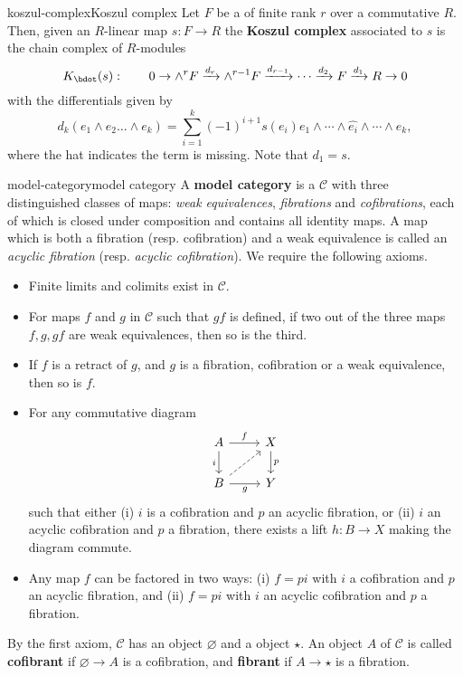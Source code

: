 \begin{topic}{koszul-complex}{Koszul complex}
    Let $F$ be a  of finite rank $r$ over a commutative  $R$. Then, given an $R$-linear map $s : F \to R$ the \textbf{Koszul complex} associated to $s$ is the chain complex of $R$-modules
    \[ K_\bdot(s) : \qquad 0 \to \wedge^r F \xrightarrow{d_r} \wedge^{r - 1} F \xrightarrow{d_{r - 1}} \cdots \xrightarrow{d_2} F \xrightarrow{d_1} R \to 0 \]
    with the differentials given by
    \[ d_k(e_1 \wedge e_2 \ldots \wedge e_k) = \sum_{i = 1}^{k} (-1)^{i + 1} s(e_i) e_1 \wedge \cdots \wedge \hat{e_i} \wedge \cdots \wedge e_k , \]
    where the hat indicates the term is missing. Note that $d_1 = s$.
\end{topic}


\begin{topic}{model-category}{model category}
    A \textbf{model category} is a  $\mathcal{C}$ with three distinguished classes of maps: \textit{weak equivalences}, \textit{fibrations} and \textit{cofibrations}, each of which is closed under composition and contains all identity maps. A map which is both a fibration (resp. cofibration) and a weak equivalence is called an \textit{acyclic fibration} (resp. \textit{acyclic cofibration}). We require the following axioms.
    \begin{itemize}
        \item Finite limits and colimits exist in $\mathcal{C}$.
        \item For maps $f$ and $g$ in $\mathcal{C}$ such that $gf$ is defined, if two out of the three maps $f, g, gf$ are weak equivalences, then so is the third.
        \item If $f$ is a retract of $g$, and $g$ is a fibration, cofibration or a weak equivalence, then so is $f$.
        \item For any commutative diagram
        \[ \begin{tikzcd} A \arrow[swap]{d}{i} \arrow{r}{f} & X \arrow{d}{p} \\ B \arrow[swap]{r}{g} \arrow[dashed]{ur} & Y \end{tikzcd} \]
        such that either (i) $i$ is a cofibration and $p$ an acyclic fibration, or (ii) $i$ an acyclic cofibration and $p$ a fibration, there exists a lift $h : B \to X$ making the diagram commute.
        \item Any map $f$ can be factored in two ways: (i) $f = pi$ with $i$ a cofibration and $p$ an acyclic fibration, and (ii) $f = pi$ with $i$ an acyclic cofibration and $p$ a fibration.
    \end{itemize}
    
    By the first axiom, $\mathcal{C}$ has an  object $\varnothing$ and a  object $\star$. An object $A$ of $\mathcal{C}$ is called \textbf{cofibrant} if $\varnothing \to A$ is a cofibration, and \textbf{fibrant} if $A \to \star$ is a fibration.
\end{topic}

